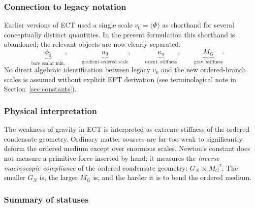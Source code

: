 \subsubsection*{Connection to legacy notation}

Earlier versions of ECT used a single scale $v_0=\langle\Phi\rangle$
as shorthand for several conceptually distinct quantities.
In the present formulation this shorthand is abandoned; the relevant
objects are now clearly separated:
\begin{equation}
  \label{eq:scale_separation}
  \underbrace{\phi_0}_{\text{bare scalar min.}},
  \qquad
  \underbrace{u_0}_{\text{gradient-ordered scale}},
  \qquad
  \underbrace{\kappa_n}_{\text{orient.\ stiffness}},
  \qquad
  \underbrace{M_G}_{\text{grav.\ stiffness}}.
\end{equation}
No direct algebraic identification between legacy $v_0$ and the
new ordered-branch scales is assumed without explicit EFT derivation
(see terminological note in Section~\ref{sec:constants}).

\subsubsection*{Physical interpretation}

The weakness of gravity in ECT is interpreted as extreme stiffness of
the ordered condensate geometry.
Ordinary matter sources are far too weak to significantly deform the
ordered medium except over enormous scales.
Newton's constant does not measure a primitive force inserted by hand;
it measures the \emph{inverse macroscopic compliance} of the ordered
condensate geometry:
$G_N\propto M_G^{-2}$.
The smaller $G_N$ is, the larger $M_G$ is, and the harder it is to
bend the ordered medium.

\subsubsection*{Summary of statuses}

